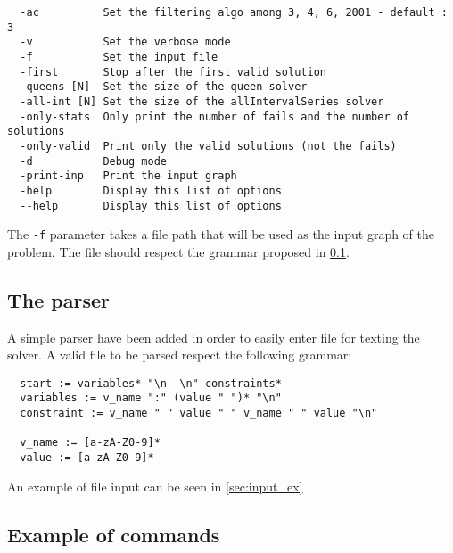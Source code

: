 \documentclass{rapport}
\begin{document}
\begin{verbatim}
  -ac          Set the filtering algo among 3, 4, 6, 2001 - default : 3
  -v           Set the verbose mode
  -f           Set the input file
  -first       Stop after the first valid solution
  -queens [N]  Set the size of the queen solver
  -all-int [N] Set the size of the allIntervalSeries solver
  -only-stats  Only print the number of fails and the number of solutions
  -only-valid  Print only the valid solutions (not the fails)
  -d           Debug mode
  -print-inp   Print the input graph
  -help        Display this list of options
  --help       Display this list of options
\end{verbatim}

The \texttt{-f} parameter takes a file path that will be used as the input graph of the problem. The file should respect the grammar proposed in \cref{sec:parser}.

\subsection{The parser}
\label{sec:parser}

A simple parser have been added in order to easily enter file for texting the solver. A valid file to be parsed respect the following grammar:

\begin{verbatim}
  start := variables* "\n--\n" constraints*
  variables := v_name ":" (value " ")* "\n"  
  constraint := v_name " " value " " v_name " " value "\n"

  v_name := [a-zA-Z0-9]*
  value := [a-zA-Z0-9]*
\end{verbatim}

An example of file input can be seen in \cref{sec:input_ex}


\subsection{Example of commands}
\end{document}
